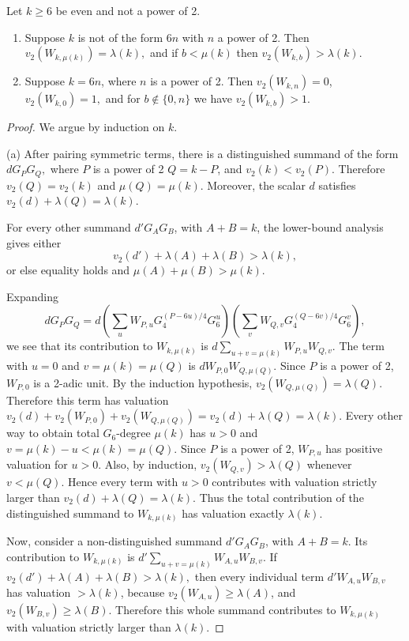 \documentclass[10pt,a4paper]{amsart}
\begin{document}
\begin{proposition} \label{Min-Witness}
Let $k\ge 6$ be even and not a power of 2. 

	\begin{enumerate}
		\item[(a)] Suppose $k$ is not of the form $6n$ with $n$ a power of 2. Then $v_2(W_{k,\mu(k)})=\lambda(k), $ and if \(b<\mu(k)\) then $v_2(W_{k,b})>\lambda(k).$
		\item[(b)] Suppose $k=6n$, where $n$ is a power of 2. Then 
			$v_2(W_{k,n})=0$, $v_2(W_{k,0})=1,$ and for $b\notin\{0,n\}$ we have $v_2(W_{k,b})>1$. 
	\end{enumerate}
\end{proposition}

\begin{proof}

We argue by induction on $k$.

(a)  After pairing symmetric terms, there is a distinguished
summand of the form $ dG_PG_Q,$ where $P$ is a power of 2 $Q=k-P$, and $ v_2(k)<v_2(P).$ Therefore $v_2(Q)=v_2(k)$ and $\mu(Q)=\mu(k)$. Moreover, the scalar $d$ satisfies $ v_2(d)+\lambda(Q)=\lambda(k). $

For every other summand  $d'G_AG_B$, with $A+B=k$, the lower-bound analysis gives either
\[
v_2(d')+\lambda(A)+\lambda(B)>\lambda(k),
\]
or else equality holds and $\mu(A)+\mu(B)>\mu(k).$

Expanding
\[ dG_PG_Q=d \left( \sum_u W_{P,u} G_4^{(P-6u)/4} G_6^u \right) \left( \sum_v W_{Q,v} G_4^{(Q-6v)/4} G_6^v \right),\] 
we see that its contribution to \(W_{k,\mu(k)}\) is $d\sum_{u+v=\mu(k)}W_{P,u}W_{Q,v}. $ The term with $u=0$ and $v=\mu(k)=\mu(Q)$ is $dW_{P,0}W_{Q,\mu(Q)}$. Since $P$ is a power of 2, $W_{P,0}$ is a 2-adic unit. By the induction hypothesis, $v_2(W_{Q,\mu(Q)})=\lambda(Q).$ Therefore this term has valuation $v_2(d)+v_2(W_{P,0})+v_2(W_{Q,\mu(Q)}) = v_2(d)+\lambda(Q) = \lambda(k). $ Every other way to obtain total $G_6$-degree $\mu(k)$ has $u>0$ and $v=\mu(k)-u<\mu(k)=\mu(Q).$ Since $P$ is a power of 2, $W_{P,u}$ has positive valuation for $u>0$.  Also, by induction, $v_2(W_{Q,v})>\lambda(Q)$ whenever $v<\mu(Q)$.  Hence every term with  $u>0$ contributes with valuation strictly larger than $v_2(d)+ \lambda(Q)=\lambda(k).$ Thus the total contribution of the distinguished summand to $W_{k,\mu(k)}$ has valuation exactly $\lambda(k)$.

Now, consider a non-distinguished summand $d'G_AG_B$, with $A+B=k$. Its contribution to $W_{k,\mu(k)}$ is $d'\sum_{u+v=\mu(k)}W_{A,u}W_{B,v}$. If
$ v_2(d')+\lambda(A)+\lambda(B)>\lambda(k),$ then every individual term $d'W_{A,u}W_{B,v}$ has valuation \(>\lambda(k)\), because $v_2(W_{A,u})\ge \lambda(A)$, and $v_2(W_{B,v})\ge \lambda(B).$ Therefore this whole summand contributes to \(W_{k,\mu(k)}\) with valuation strictly larger than  $\lambda(k)$.


\end{proof}
\end{document}
